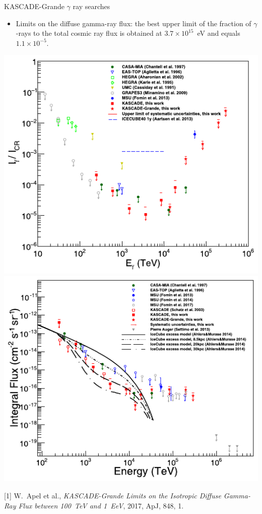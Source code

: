 \begin{frame}{KASCADE-Grande $\gamma$ ray searches}
\begin{itemize}
 \item Limits on the diffuse gamma-ray flux: the best upper limit of the fraction of $\gamma$-rays
to the total cosmic ray flux is obtained at $3.7 \times 10^{15}$~eV and equals $1.1 \times 10^{-5}$.
\end{itemize}
\begin{center}
  \includegraphics[height=0.56\textheight]{pics/KASCADE-Grande_UHECR2016-1.pdf}
  \includegraphics[height=0.56\textheight]{pics/KASCADE-Grande_UHECR2016-2.pdf}
\end{center}
\vspace{-2ex}
\small
[1] W.~Apel et al., \textit{KASCADE-Grande Limits on the Isotropic Diffuse Gamma-Ray Flux between 100~TeV and 1~EeV}, 2017, ApJ, 848, 1.
\end{frame}
